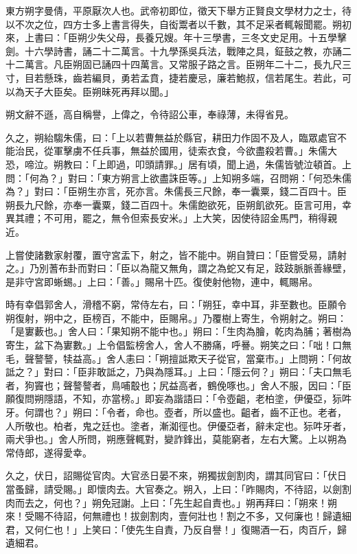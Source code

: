 
\begin{pinyinscope}
東方朔字曼倩，平原厭次人也。武帝初即位，徵天下舉方正賢良文學材力之士，待以不次之位，四方士多上書言得失，自衒鬻者以千數，其不足采者輒報聞罷。朔初來，上書曰：「臣朔少失父母，長養兄嫂。年十三學書，三冬文史足用。十五學擊劍。十六學詩書，誦二十二萬言。十九學孫吳兵法，戰陣之具，鉦鼓之教，亦誦二十二萬言。凡臣朔固已誦四十四萬言。又常服子路之言。臣朔年二十二，長九尺三寸，目若懸珠，齒若編貝，勇若孟賁，捷若慶忌，廉若鮑叔，信若尾生。若此，可以為天子大臣矣。臣朔昧死再拜以聞。」

朔文辭不遜，高自稱譽，上偉之，令待詔公車，奉祿薄，未得省見。

久之，朔紿騶朱儒，曰：「上以若曹無益於縣官，耕田力作固不及人，臨眾處官不能治民，從軍擊虜不任兵事，無益於國用，徒索衣食，今欲盡殺若曹。」朱儒大恐，啼泣。朔教曰：「上即過，叩頭請罪。」居有頃，聞上過，朱儒皆號泣頓首。上問：「何為？」對曰：「東方朔言上欲盡誅臣等。」上知朔多端，召問朔：「何恐朱儒為？」對曰：「臣朔生亦言，死亦言。朱儒長三尺餘，奉一囊粟，錢二百四十。臣朔長九尺餘，亦奉一囊粟，錢二百四十。朱儒飽欲死，臣朔飢欲死。臣言可用，幸異其禮；不可用，罷之，無令但索長安米。」上大笑，因使待詔金馬門，稍得親近。

上嘗使諸數家射覆，置守宮盂下，射之，皆不能中。朔自贊曰：「臣嘗受易，請射之。」乃別蓍布卦而對曰：「臣以為龍又無角，謂之為蛇又有足，跂跂脈脈善緣壁，是非守宮即蜥蜴。」上曰：「善。」賜帛十匹。復使射他物，連中，輒賜帛。

時有幸倡郭舍人，滑稽不窮，常侍左右，曰：「朔狂，幸中耳，非至數也。臣願令朔復射，朔中之，臣榜百，不能中，臣賜帛。」乃覆樹上寄生，令朔射之。朔曰：「是寠藪也。」舍人曰：「果知朔不能中也。」朔曰：「生肉為膾，乾肉為脯；著樹為寄生，盆下為寠數。」上令倡監榜舍人，舍人不勝痛，呼謈。朔笑之曰：「咄！口無毛，聲謷謷，犊益高。」舍人恚曰：「朔擅詆欺天子從官，當棄巿。」上問朔：「何故詆之？」對曰：「臣非敢詆之，乃與為隱耳。」上曰：「隱云何？」朔曰：「夫口無毛者，狗竇也；聲謷謷者，鳥哺鷇也；尻益高者，鶴俛啄也。」舍人不服，因曰：「臣願復問朔隱語，不知，亦當榜。」即妄為諧語曰：「令壺齟，老柏塗，伊優亞，狋吽牙。何謂也？」朔曰：「令者，命也。壺者，所以盛也。齟者，齒不正也。老者，人所敬也。柏者，鬼之廷也。塗者，漸洳徑也。伊優亞者，辭未定也。狋吽牙者，兩犬爭也。」舍人所問，朔應聲輒對，變詐鋒出，莫能窮者，左右大驚。上以朔為常侍郎，遂得愛幸。

久之，伏日，詔賜從官肉。大官丞日晏不來，朔獨拔劍割肉，謂其同官曰：「伏日當蚤歸，請受賜。」即懷肉去。大官奏之。朔入，上曰：「昨賜肉，不待詔，以劍割肉而去之，何也？」朔免冠謝。上曰：「先生起自責也。」朔再拜曰：「朔來！朔來！受賜不待詔，何無禮也！拔劍割肉，壹何壯也！割之不多，又何廉也！歸遺細君，又何仁也！」上笑曰：「使先生自責，乃反自譽！」復賜酒一石，肉百斤，歸遺細君。


\end{pinyinscope}
